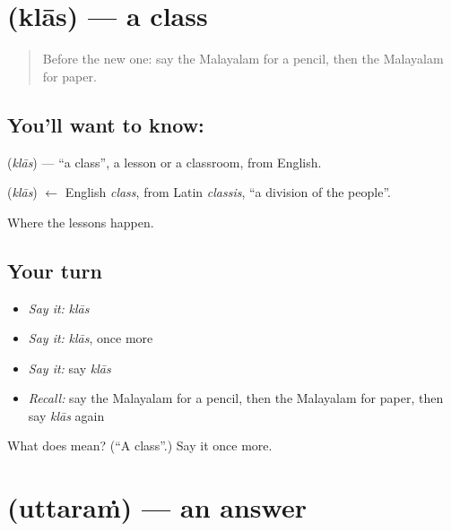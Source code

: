 \section[\texorpdfstring{\ml{ക്ലാസ്} (klās)}{ക്ലാസ് (klās)}]{ (klās) — a class}

\label{lesson:ML-C140-class}



\begin{quote}
Before the new one: say the Malayalam for a pencil, then the Malayalam for paper.
\end{quote}

\subsection*{You'll want to know: }
\textbf{} (\emph{klās}) — \textquotedblleft{}a class\textquotedblright{}, a lesson or a classroom, from English.

\begin{cousinweb}
\textbf{} (\emph{klās}) $\leftarrow$ English \emph{class}, from Latin \emph{classis}, \textquotedblleft{}a division of the people\textquotedblright{}.
\end{cousinweb}

\begin{grammarlens}[title={What you've built}]
Where the lessons happen.
\end{grammarlens}

\subsection*{Your turn}
\begin{itemize}
\raggedright
  \item \emph{Say it:} \emph{klās}
  \item \emph{Say it:} \emph{klās}, once more
  \item \emph{Say it:} say \emph{klās}
  \item \emph{Recall:} say the Malayalam for a pencil, then the Malayalam for paper, then say \emph{klās} again
\end{itemize}

\begin{tcolorbox}[breakable,colback=teal!4,colframe=teal!35!black,title={Before you move on}]
What does  mean? (\textquotedblleft{}A class\textquotedblright{}.) Say it once more.
\end{tcolorbox}
\section[\texorpdfstring{\ml{ഉത്തരം} (uttaraṁ)}{ഉത്തരം (uttaraṁ)}]{ (uttaraṁ) — an answer}

